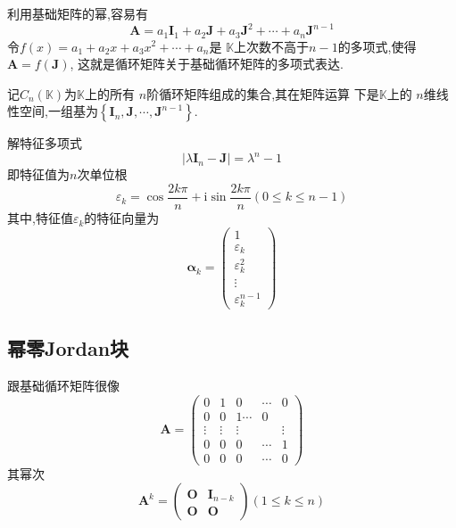 \begin{formal}
\begin{theorem}[循环矩阵关于基础循环矩阵的多项式表示]\label{thm:循环矩阵关于基础循环矩阵的多项式表示}
    利用基础矩阵的幂,容易有
    \[
    \bm{A}=a_1\bm{I}_1+a_2\bm{J}+a_3\bm{J}^2
    +\cdots+a_n\bm{J}^{n-1}
    \]
    令$f\left(x\right)=a_1+a_2x+a_3x^2+\cdots+a_n$是
    $\mathbb{K}$上次数不高于$n-1$的多项式,使得$\bm{A}=f\left(\bm{J}\right)$,
    这就是循环矩阵关于基础循环矩阵的多项式表达.
\end{theorem}
\end{formal}
\begin{formal}
    \begin{theorem}[全体循环矩阵]\label{thm:全体循环矩阵}
        记$C_n\left(\mathbb{K}\right)$为$\mathbb{K}$上的所有
        $n$阶循环矩阵组成的集合,其在矩阵运算
        下是$\mathbb{K}$上的
        $n$维线性空间,一组基为$\left\{
            \bm{I}_n,\bm{J},\cdots,\bm{J}^{n-1}
        \right\}$.
    \end{theorem}
\end{formal}
\begin{formal}
\begin{theorem}[基础循环矩阵的特征值]\label{thm:基础循环矩阵的特征值}
    解特征多项式
    \[
    \left|\lambda \bm{I}_n-\bm{J}\right|=\lambda^n-1
    \]
    即特征值为$n$次单位根
    \[
    \varepsilon_k = \cos\frac{2k\pi}{n}+\mathrm{i}\sin\frac{2k\pi}{n}\left(0\leqslant k\leqslant n - 1\right)
    \]
    其中,特征值$\varepsilon_k$的特征向量为
    \newpage
    \[
    \bm{\alpha}_k=
    \begin{pmatrix}
        1\\\varepsilon_k\\\varepsilon_k^2\\\vdots\\\varepsilon_k^{n-1}
    \end{pmatrix}
    \]
\end{theorem}
\end{formal}
\subsection{幂零Jordan块}
\begin{formal}
\begin{definition}[幂零Jordan块]\label{def:幂零Jordan块}
    跟基础循环矩阵很像
\[
\bm{A}=\begin{pmatrix}
        0&1&0&\cdots&0\\
        0&0&1\cdots&0\\
        \vdots&\vdots&\vdots&&\vdots\\
        0&0&0&\cdots&1\\
        0&0&0&\cdots&0
    \end{pmatrix}
\]
其幂次
\[
\bm{A}^k=\begin{pmatrix}
    \bm{O}&\bm{I}_{n-k}\\
    \bm{O}&\bm{O}
\end{pmatrix}\left(1\leqslant k\leqslant 
n\right)
\]
\end{definition}
\end{formal}
